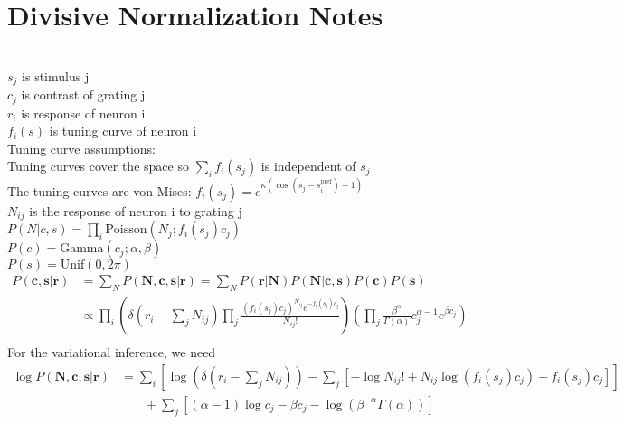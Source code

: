 \documentclass[12pt]{article}
\begin{document}
\section*{Divisive Normalization Notes}

\\
$s_j$ is stimulus j\\
$c_j$ is contrast of grating j\\
$r_i$ is response of neuron i\\
$f_i(s)$ is tuning curve of neuron i\\
Tuning curve assumptions:\\
Tuning curves cover the space so $\sum_i f_i(s_j)$ is independent of $s_j$\\
The tuning curves are von Mises: $f_i(s_j) = e^{\kappa(\cos(s_j - s_i^{\text{pref}}) - 1)}$\\
$N_{ij}$ is the response of neuron i to grating j\\
$P(N|c, s) = \prod_i \text{Poisson}(N_{j}; f_i(s_j)c_j)$\\
$P(c) = \text{Gamma}(c_j; \alpha, \beta)$\\
$P(s) = \text{Unif}(0, 2\pi)$\\
\begin{equation}
\begin{aligned}
P(\mathbf{c, s|r}) & = \sum_N P(\mathbf{N, c, s|r}) = \sum_N P(\mathbf{r|N}) P(\mathbf{N|c, s}) P(\mathbf{c}) P(\mathbf{s})\\
&\propto \prod_i (\delta(r_i - \sum_j N_{ij}) \prod_j\frac{(f_i(s_j)c_j)^{N_{ij}} e^{-f_i(s_j) c_j}}{N_{ij}!}) (\prod_j \frac{\beta^{\alpha}}{\Gamma(\alpha)} c_j^{\alpha - 1}e^{\beta c_j})\\
\end{aligned}
\end{equation}
For the variational inference, we need\\
\begin{equation}
\begin{aligned}
\log P(\mathbf{N, c, s| r}) &= \sum_i [\log(\delta(r_i - \sum_j N_{ij})) - \sum_j [- \log N_{ij}! + N_{ij} \log(f_i(s_j)c_j) - f_i(s_j) c_j]]\\
& \phantom{{}=1} + \sum_j[(\alpha - 1) \log c_j - \beta c_j - \log (\beta^{- \alpha} \Gamma (\alpha))]\\
\end{aligned}
\end{equation}
\end{document}
